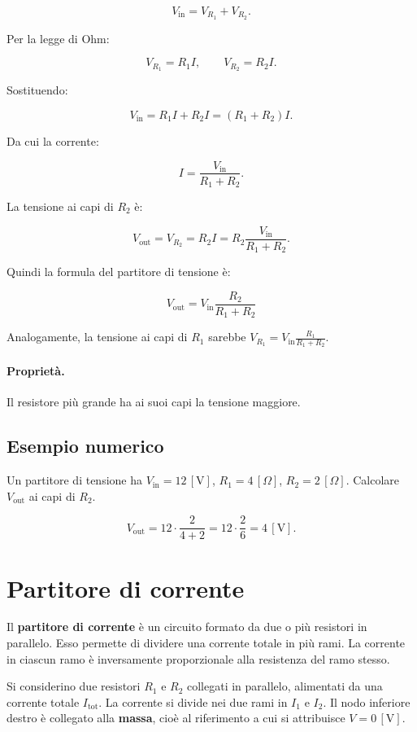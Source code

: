 \[
V_{\text{in}} = V_{R_1} + V_{R_2}.
\]

Per la legge di Ohm:

\[
V_{R_1} = R_1 I, \qquad V_{R_2} = R_2 I.
\]

Sostituendo:

\[
V_{\text{in}} = R_1 I + R_2 I = (R_1 + R_2) I.
\]

Da cui la corrente:

\[
I = \frac{V_{\text{in}}}{R_1 + R_2}.
\]

La tensione ai capi di \(R_2\) è:

\[
V_{\text{out}} = V_{R_2} = R_2 I = R_2 \frac{V_{\text{in}}}{R_1 + R_2}.
\]

Quindi la formula del partitore di tensione è:

\[
\boxed{
V_{\text{out}} = V_{\text{in}} \frac{R_2}{R_1 + R_2}
}
\]

Analogamente, la tensione ai capi di \(R_1\) sarebbe \(V_{R_1} = V_{\text{in}} \frac{R_1}{R_1 + R_2}\).

\paragraph{Proprietà.}
Il resistore più grande ha ai suoi capi la tensione maggiore.
\subsection{Esempio numerico}

Un partitore di tensione ha \(V_{\text{in}} = 12\,[\text{V}]\), \(R_1 = 4\,[\Omega]\), \(R_2 = 2\,[\Omega]\). Calcolare \(V_{\text{out}}\) ai capi di \(R_2\).

\[
V_{\text{out}} = 12 \cdot \frac{2}{4+2} = 12 \cdot \frac{2}{6} = 4\,[\text{V}].
\]

\section{Partitore di corrente}

\begin{concetto}
Il \textbf{partitore di corrente} è un circuito formato da due o più resistori in parallelo. Esso permette di dividere una corrente totale in più rami. La corrente in ciascun ramo è inversamente proporzionale alla resistenza del ramo stesso.
\end{concetto}


Si considerino due resistori \(R_1\) e \(R_2\) collegati in parallelo, alimentati da una corrente totale \(I_{\text{tot}}\). La corrente si divide nei due rami in \(I_1\) e \(I_2\). Il nodo inferiore destro è collegato alla \textbf{massa}, cioè al riferimento a cui si attribuisce \(V = 0\,[\text{V}]\).


